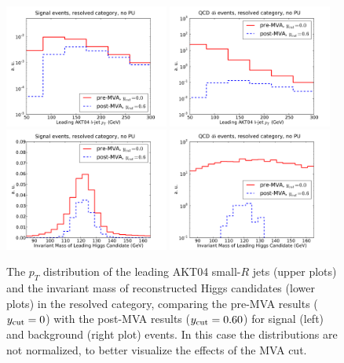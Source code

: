 \begin{figure}[t]
\begin{center}
\includegraphics[width=0.48\textwidth]{plots/pt_H0_sub0_res_noPU_ANNcut.pdf}
\includegraphics[width=0.48\textwidth]{plots/pt_H0_sub0_res_noPU_ANNcut_back_4b.pdf}
\includegraphics[width=0.48\textwidth]{plots/m_H0_res_noPU_ANNcut.pdf}
\includegraphics[width=0.48\textwidth]{plots/m_H0_res_noPU_ANNcut_back_4b.pdf}
\caption{\small
  The $p_T$ distribution of the leading AKT04 small-$R$ jets (upper plots)
  and
  the invariant mass of reconstructed Higgs candidates (lower plots) in the resolved
  category, comparing the pre-MVA results ($y_{\rm cut}=0$) with the post-MVA
  results ($y_{\rm cut}=0.60$) for signal (left) and background (right plot) events.
  In this case the distributions are not normalized, to better visualize the effects
  of the MVA cut.
}
\label{fig:pt_H0_sub0_res_noPU_ANNcut}
\end{center}
\end{figure}

